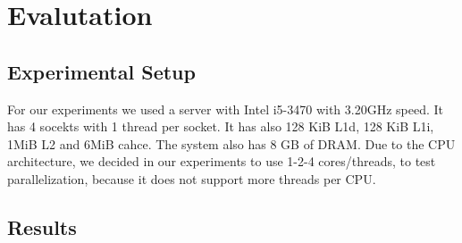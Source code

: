 \section{Evalutation}
\label{sec:experiments}

\subsection{Experimental Setup}
For our experiments we used a server with Intel i5-3470 with 3.20GHz speed. It has 4 socekts with 1 thread per socket. It has also 128 KiB L1d, 128 KiB L1i, 1MiB L2 and 6MiB cahce. The system also has 8 GB of DRAM. Due to the CPU architecture, we decided in our experiments to use 1-2-4 cores/threads, to test parallelization, because it does not support more threads per CPU.

\subsection{Results}

